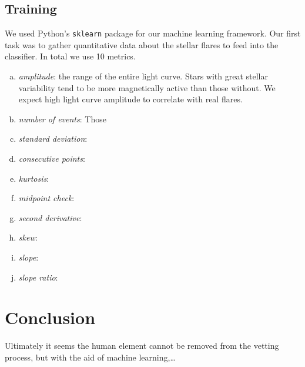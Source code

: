 \documentclass[11pt]{article}
\begin{document}
\subsection{Training}
\label{sec:train}
We used Python's \verb|sklearn| package for our machine learning
framework.  Our first task was to gather quantitative data about the
stellar flares to feed into the classifier.  In total we use 10
metrics.
\begin{enumerate}[(a)]
\item \emph{amplitude}: the range of the entire light curve.  Stars
  with great stellar variability tend to be more magnetically active
  than those without.  We expect high light curve amplitude to
  correlate with real flares.
\item \emph{number of events}:  Those 
\item \emph{standard deviation}:
\item \emph{consecutive points}:
\item \emph{kurtosis}:
\item \emph{midpoint check}:
\item \emph{second derivative}:
\item \emph{skew}:
\item \emph{slope}:
\item \emph{slope ratio}:
\end{enumerate}


\section{Conclusion}
\label{sec:conc}
Ultimately it seems the human element cannot be removed from the
vetting process, but with the aid of machine learning,\ldots
\end{document}
